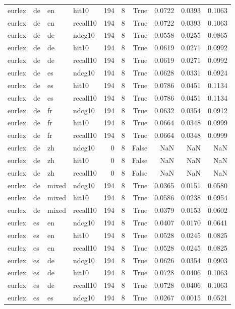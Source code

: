 \begin{tabular}{llllrrrrrr}
eurlex & de & en & hit10 & 194 & 8 & True & 0.0722 & 0.0393 & 0.1063 \\
eurlex & de & en & recall10 & 194 & 8 & True & 0.0722 & 0.0393 & 0.1063 \\
eurlex & de & de & ndcg10 & 194 & 8 & True & 0.0558 & 0.0255 & 0.0865 \\
eurlex & de & de & hit10 & 194 & 8 & True & 0.0619 & 0.0271 & 0.0992 \\
eurlex & de & de & recall10 & 194 & 8 & True & 0.0619 & 0.0271 & 0.0992 \\
eurlex & de & es & ndcg10 & 194 & 8 & True & 0.0628 & 0.0331 & 0.0924 \\
eurlex & de & es & hit10 & 194 & 8 & True & 0.0786 & 0.0451 & 0.1134 \\
eurlex & de & es & recall10 & 194 & 8 & True & 0.0786 & 0.0451 & 0.1134 \\
eurlex & de & fr & ndcg10 & 194 & 8 & True & 0.0632 & 0.0354 & 0.0912 \\
eurlex & de & fr & hit10 & 194 & 8 & True & 0.0664 & 0.0348 & 0.0999 \\
eurlex & de & fr & recall10 & 194 & 8 & True & 0.0664 & 0.0348 & 0.0999 \\
eurlex & de & zh & ndcg10 & 0 & 8 & False & NaN & NaN & NaN \\
eurlex & de & zh & hit10 & 0 & 8 & False & NaN & NaN & NaN \\
eurlex & de & zh & recall10 & 0 & 8 & False & NaN & NaN & NaN \\
eurlex & de & mixed & ndcg10 & 194 & 8 & True & 0.0365 & 0.0151 & 0.0580 \\
eurlex & de & mixed & hit10 & 194 & 8 & True & 0.0586 & 0.0238 & 0.0954 \\
eurlex & de & mixed & recall10 & 194 & 8 & True & 0.0379 & 0.0153 & 0.0602 \\
eurlex & es & en & ndcg10 & 194 & 8 & True & 0.0407 & 0.0170 & 0.0641 \\
eurlex & es & en & hit10 & 194 & 8 & True & 0.0528 & 0.0245 & 0.0825 \\
eurlex & es & en & recall10 & 194 & 8 & True & 0.0528 & 0.0245 & 0.0825 \\
eurlex & es & de & ndcg10 & 194 & 8 & True & 0.0626 & 0.0354 & 0.0903 \\
eurlex & es & de & hit10 & 194 & 8 & True & 0.0728 & 0.0406 & 0.1063 \\
eurlex & es & de & recall10 & 194 & 8 & True & 0.0728 & 0.0406 & 0.1063 \\
eurlex & es & es & ndcg10 & 194 & 8 & True & 0.0267 & 0.0015 & 0.0521 \\

\end{tabular}
